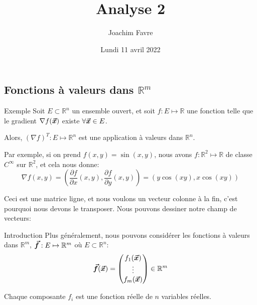 \documentclass[a4paper]{article}
\title{Analyse 2}
\author{Joachim Favre}
\date{Lundi 11 avril 2022}
\begin{document}
\maketitle

\subsection{Fonctions à valeurs dans $\mathbb{R}^m$}

\begin{parag}{Exemple}
    Soit $E \subset \mathbb{R}^n$ un ensemble ouvert, et soit $f: E \mapsto \mathbb{R}$ une fonction telle que le gradient $\nabla f\left(\bvec{x}\right)$ existe $\forall \bm{\protect\vec{x}} \in E$.

    Alors, $\left(\nabla f\right)^T: E \mapsto \mathbb{R}^n$ est une application à valeurs dans $\mathbb{R}^n$.

    Par exemple, si on prend $f\left(x, y\right) = \sin\left(x, y\right)$, nous avons $f: \mathbb{R}^2 \mapsto \mathbb{R}$ de classe $C^{\infty}$ sur $\mathbb{R}^2$, et cela nous donne: 
    \[\nabla f\left(x, y\right) = \left(\frac{\partial f}{\partial x}\left(x, y\right), \frac{\partial f}{\partial y}\left(x, y\right)\right) = \left(y \cos\left(xy\right), x\cos\left(xy\right)\right)\]
    
    Ceci est une matrice ligne, et nous voulons un vecteur colonne à la fin, c'est pourquoi nous devons le transposer. Nous pouvons dessiner notre champ de vecteurs:
\end{parag}

\begin{parag}{Introduction}
    Plus généralement, nous pouvons considérer les fonctions à valeurs dans $\mathbb{R}^m$, $\bm{\protect\vec{f}} : E \mapsto \mathbb{R}^m$ où $E \subset \mathbb{R}^n$:
    \[\bvec{f}\left(\bvec{x}\right) = \begin{pmatrix} f_1\left(\bvec{x}\right) \\ \vdots \\ f_m\left(\bvec{x}\right) \end{pmatrix} \in \mathbb{R}^m\]
    
    Chaque composante $f_i$ est une fonction réelle de $n$ variables réelles.
\end{parag}
\end{document}
